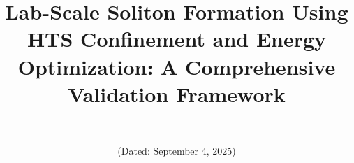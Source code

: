 \documentclass[12pt,a4paper]{article}
\begin{document}
\title{Lab-Scale Soliton Formation Using HTS Confinement and Energy Optimization: A Comprehensive Validation Framework}

\author{\authorname\\\texttt{\authoremail}}
\date{(Dated: September 4, 2025)}

\maketitle
\end{document}
